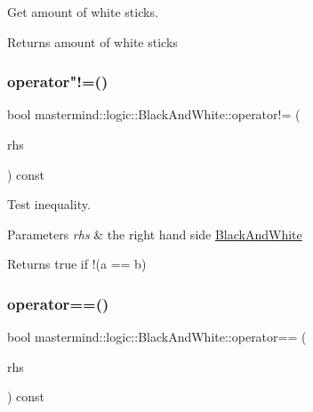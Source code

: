 Get amount of white sticks. 

\begin{DoxyReturn}{Returns}
amount of white sticks 
\end{DoxyReturn}
\hypertarget{classmastermind_1_1logic_1_1_black_and_white_a8d622959805faeb3f63b0342667b58f7}{}\label{classmastermind_1_1logic_1_1_black_and_white_a8d622959805faeb3f63b0342667b58f7} 
\subsubsection{\texorpdfstring{operator"!=()}{operator!=()}}
{\footnotesize\ttfamily bool mastermind\+::logic\+::\+Black\+And\+White\+::operator!= (\begin{DoxyParamCaption}\item[{const \hyperlink{classmastermind_1_1logic_1_1_black_and_white}{Black\+And\+White} \&}]{rhs }\end{DoxyParamCaption}) const}



Test inequality. 


\begin{DoxyParams}{Parameters}
{\em rhs} & the right hand side \hyperlink{classmastermind_1_1logic_1_1_black_and_white}{Black\+And\+White} \\
\hline
\end{DoxyParams}
\begin{DoxyReturn}{Returns}
{\ttfamily true} if {\ttfamily !(a == b)} 
\end{DoxyReturn}
\hypertarget{classmastermind_1_1logic_1_1_black_and_white_ade7da8e1b846896a978f619b9689a7cb}{}\label{classmastermind_1_1logic_1_1_black_and_white_ade7da8e1b846896a978f619b9689a7cb} 
\subsubsection{\texorpdfstring{operator==()}{operator==()}}
{\footnotesize\ttfamily bool mastermind\+::logic\+::\+Black\+And\+White\+::operator== (\begin{DoxyParamCaption}\item[{const \hyperlink{classmastermind_1_1logic_1_1_black_and_white}{Black\+And\+White} \&}]{rhs }\end{DoxyParamCaption}) const}



